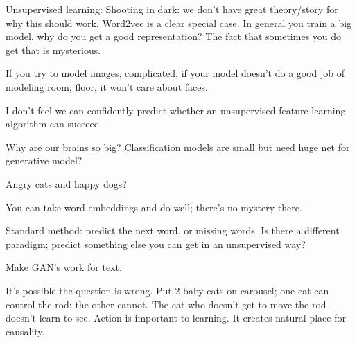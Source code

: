 
Unsupervised learning: Shooting in dark: we don't have great theory/story for why this should work. Word2vec is a clear special case. In general you train a big model, why do you get a good representation? The fact that sometimes you do get that is mysterious. 

If you try to model images, complicated, if your model doesn't do a good job of modeling room, floor, it won't care about faces. %


I don't feel we can confidently predict whether an unsupervised feature learning algorithm can succeed.


Why are our brains so big? Classification models are small but need huge net for generative model? 

Angry cats and happy dogs?


You can take word embeddings and do well; there's no mystery there.

Standard method: predict the next word, or missing words. Is there a different paradigm; predict something else you can get in an unsupervised way?

Make GAN's work for text.

It's possible the question is wrong. Put 2 baby cats on carousel; one cat can control the rod; the other cannot. The cat who doesn't get to move the rod doesn't learn to see. Action is important to learning. It creates natural place for causality.





